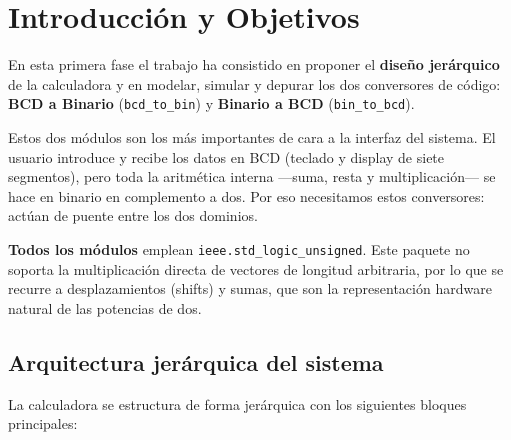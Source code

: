 \documentclass[memoria_final]{subfiles}
\begin{document}
	\newpage
	\tableofcontents
	\newpage
\fi%
{}

	\section{Introducción y Objetivos}
	
	En esta primera fase el trabajo ha consistido en proponer el \textbf{diseño jerárquico} de la calculadora y en modelar, simular y depurar los dos conversores de código: \textbf{BCD a Binario} (\texttt{bcd\_to\_bin}) y \textbf{Binario a BCD} (\texttt{bin\_to\_bcd}).
	
	Estos dos módulos son los más importantes de cara a la interfaz del sistema. El usuario introduce y recibe los datos en BCD (teclado y display de siete segmentos), pero toda la aritmética interna ---suma, resta y multiplicación--- se hace en binario en complemento a dos. Por eso necesitamos estos conversores: actúan de puente entre los dos dominios.
	
	\vspace{0.5em}
	\begin{tcolorbox}[colback=SoftBlue, colframe=MainBlue, boxrule=0.8pt, arc=2pt,
		left=0.5cm, right=0.5cm, top=0.3cm, bottom=0.3cm]
		\small\faInfoCircle\enspace\textbf{Todos los módulos} emplean
		\texttt{ieee.std\_logic\_unsigned}. Este paquete no soporta la multiplicación
		directa de vectores de longitud arbitraria, por lo que se recurre a
		desplazamientos (shifts) y sumas, que son la representación hardware natural
		de las potencias de dos.
	\end{tcolorbox}
	
	\subsection{Arquitectura jerárquica del sistema}
	
	La calculadora se estructura de forma jerárquica con los siguientes bloques principales:
	
\end{document}
